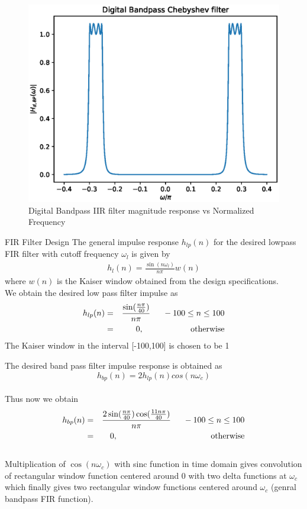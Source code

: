\documentclass{beamer}
\begin{document}
\begin{frame}
\begin{figure}[!h]
\includegraphics[width=0.75\columnwidth]{./figs_iir/ee18btech11034_Digital_IIR_Bandpass.eps}
\caption{Digital Bandpass IIR filter magnitude response vs Normalized Frequency}
\label{fig:Figure9}
\end{figure}
\end{frame}
\begin{frame}{FIR Filter Design}
The general impulse response $h_{lp}(n)$ for the desired lowpass FIR filter with cutoff frequency $\omega_{l}$ is given by 
\begin{align}
h_{l}(n) = \frac{\sin(n\omega_{l})}{n\pi} w(n)
\end{align}
where $w(n)$ is the Kaiser window obtained from the design specifications.
\\
We obtain the desired low pass filter impulse as 
\begin{eqnarray}
h_{lp}(n) &=& \frac{\sin(\frac{n\pi}{40})}{n\pi} \indent -100 \leq n \leq 100 \nonumber \\
&=& 0, \hspace{2cm} \mbox{otherwise}
\end{eqnarray}
The Kaiser window in the interval [-100,100] is chosen to be 1
\\
\end{frame}
\begin{frame}
The desired band pass filter impulse response is obtained as 
\begin{equation}
h_{bp}(n) = 2h_{lp}(n)cos(n\omega_c)
\end{equation}
\\
Thus now we obtain
\begin{eqnarray}
h_{bp}(n) &=& \frac{2\sin(\frac{n\pi}{40}) \cos(\frac{11n\pi}{40})}{n\pi} \indent -100 \leq n \leq 100 \nonumber \\
&=& 0, \hspace{4cm} \mbox{otherwise}
\end{eqnarray}
\\
Multiplication of $\cos(n\omega_{c})$ with sinc function in time domain gives convolution of rectangular window function centered around 0 with two delta functions at $\omega_{c}$ which finally gives two rectangular window functions centered around $\omega_{c}$ (genral bandpass FIR function).
\end{frame}
\end{document}
